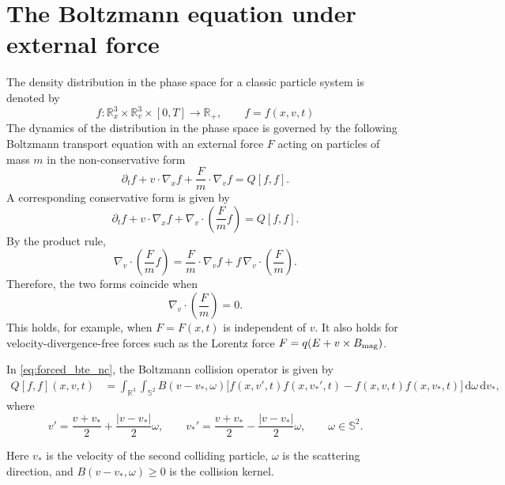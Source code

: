 \documentclass[11pt]{article}
\newcommand{\R}{\mathbb{R}}
\newcommand{\Sph}{\mathbb{S}^{2}}
\newcommand{\dd}{\,\mathrm{d}}
\theoremstyle{plain}
\begin{document}
\section{The Boltzmann equation under external force}
\label{sec:bte-forced}
The density distribution in the phase space for a classic particle system is denoted by
\[
f:\R_x^3\times \R_v^3\times [0,T]\to \R_{+},
\qquad f=f(x,v,t)
\]
The dynamics of the distribution  in the phase space is governed by the following Boltzmann transport equation with an external force $F$ acting on particles of mass $m$ in the non-conservative form
\begin{equation}
\partial_t f+v\cdot\nabla_x f+\frac{F}{m}\cdot\nabla_v f=Q[f,f].
\label{eq:forced_bte_nc}
\end{equation}
A corresponding conservative form is given by
\begin{equation}
\partial_t f+v\cdot \nabla_x f+
\nabla_v\cdot\left(\frac{F}{m}f\right)=Q[f,f].
\label{eq:forced_bte_c}
\end{equation}
By the product rule,
\[
\nabla_v\cdot\left(\frac{F}{m}f\right)
=
\frac{F}{m}\cdot\nabla_v f
+
f\,\nabla_v\cdot\left(\frac{F}{m}\right).
\]
Therefore, the two forms coincide when
\begin{equation}
\nabla_v\cdot\left(\frac{F}{m}\right)=0.
\label{eq:force_divergence_free}
\end{equation}
This holds, for example, when $F=F(x,t)$ is independent of $v$. It also holds for velocity-divergence-free forces such as the Lorentz force $F=q(E+v\times B_{\rm mag})$.

In \eqref{eq:forced_bte_nc}, the Boltzmann collision operator is given by
\begin{equation}
\begin{aligned}
Q[f,f](x,v,t)
&=
\int_{\R^3}\int_{\Sph}
B(v-v_*,\omega)
\Big[f(x,v',t)f(x,v_*',t)-f(x,v,t)f(x,v_*,t)\Big]
\dd\omega\dd v_* ,
\end{aligned}
\label{eq:collision_operator}
\end{equation}
where
\begin{equation}
v'=\frac{v+v_*}{2}+\frac{|v-v_*|}{2}\omega,
\qquad
v_*'=\frac{v+v_*}{2}-\frac{|v-v_*|}{2}\omega,
\qquad \omega\in\Sph.
\label{eq:post_collision_velocities}
\end{equation}

Here $v_*$ is the velocity of the second colliding particle, $\omega$ is the scattering direction, and $B(v-v_*,\omega)\ge 0$ is the collision kernel.
\end{document}
